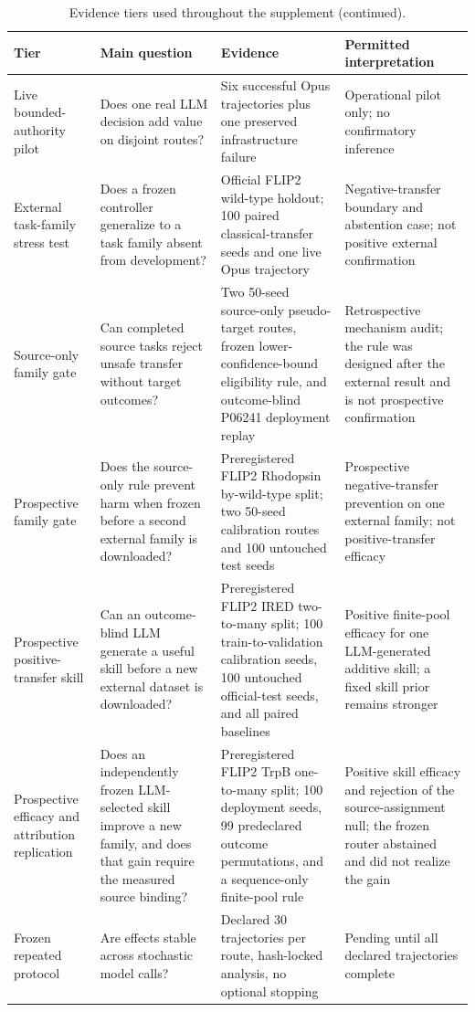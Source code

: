 \documentclass[pdflatex,sn-nature]{sn-jnl}
\begin{document}
\begin{appendices}
\begin{table}[t]
\centering
\caption{Evidence tiers used throughout the supplement (continued).}
\label{tab:evidence_tiers_continued}
\scriptsize
\setlength{\tabcolsep}{3pt}
\renewcommand{\arraystretch}{0.92}
\begin{tabularx}{\textwidth}{p{2.5cm}p{3.6cm}X p{3.2cm}}
\toprule
Tier & Main question & Evidence & Permitted interpretation \\
\midrule
Live bounded-authority pilot & Does one real LLM decision add value on disjoint routes? & Six successful Opus trajectories plus one preserved infrastructure failure & Operational pilot only; no confirmatory inference \\
External task-family stress test & Does a frozen controller generalize to a task family absent from development? & Official FLIP2 wild-type holdout; 100 paired classical-transfer seeds and one live Opus trajectory & Negative-transfer boundary and abstention case; not positive external confirmation \\
Source-only family gate & Can completed source tasks reject unsafe transfer without target outcomes? & Two 50-seed source-only pseudo-target routes, frozen lower-confidence-bound eligibility rule, and outcome-blind P06241 deployment replay & Retrospective mechanism audit; the rule was designed after the external result and is not prospective confirmation \\
Prospective family gate & Does the source-only rule prevent harm when frozen before a second external family is downloaded? & Preregistered FLIP2 Rhodopsin by-wild-type split; two 50-seed calibration routes and 100 untouched test seeds & Prospective negative-transfer prevention on one external family; not positive-transfer efficacy \\
Prospective positive-transfer skill & Can an outcome-blind LLM generate a useful skill before a new external dataset is downloaded? & Preregistered FLIP2 IRED two-to-many split; 100 train-to-validation calibration seeds, 100 untouched official-test seeds, and all paired baselines & Positive finite-pool efficacy for one LLM-generated additive skill; a fixed skill prior remains stronger \\
Prospective efficacy and attribution replication & Does an independently frozen LLM-selected skill improve a new family, and does that gain require the measured source binding? & Preregistered FLIP2 TrpB one-to-many split; 100 deployment seeds, 99 predeclared outcome permutations, and a sequence-only finite-pool rule & Positive skill efficacy and rejection of the source-assignment null; the frozen router abstained and did not realize the gain \\
Frozen repeated protocol & Are effects stable across stochastic model calls? & Declared 30 trajectories per route, hash-locked analysis, no optional stopping & Pending until all declared trajectories complete \\
\bottomrule
\end{tabularx}
\end{table}


\end{appendices}
\end{document}
